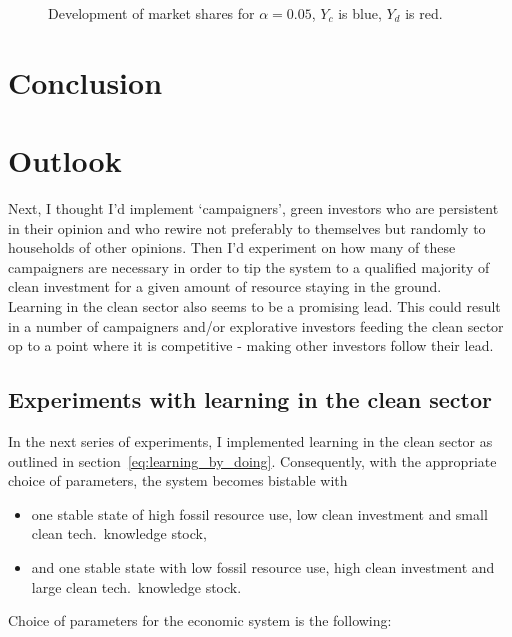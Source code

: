 \begin{figure}[t]
	\centering
	\caption{Development of market shares for $\alpha=0.05$, $Y_c$ is blue, $Y_d$ is red.}

\end{figure}


\section{Conclusion}
\section{Outlook}
Next, I thought I'd implement `campaigners', green investors who are persistent in their opinion and who rewire not preferably to themselves but randomly to households of other opinions. Then I'd experiment on how many of these campaigners are necessary in order to tip the system to a qualified majority of clean investment for a given amount of resource staying in the ground. \\

Learning in the clean sector also seems to be a promising lead. This could result in a number of campaigners and/or explorative investors feeding the clean sector op to a point where it is competitive - making other investors follow their lead.

\subsection{Experiments with learning in the clean sector}

In the next series of experiments, I implemented learning in the clean sector as outlined in section~\ref{eq:learning_by_doing}.
Consequently, with the appropriate choice of parameters, the system becomes bistable with 
\begin{itemize}
	\item one stable state of high fossil resource use, low clean investment and small clean tech.\ knowledge stock,
	\item and one stable state with low fossil resource use, high clean investment and large clean tech.\ knowledge stock.
\end{itemize}
Choice of parameters for the economic system is the following:

